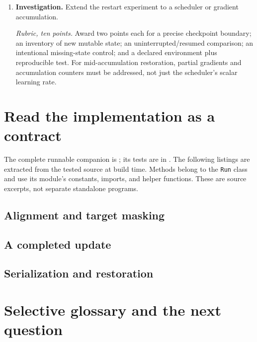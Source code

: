 \begin{enumerate}
\item \textbf{Investigation.} Extend the restart experiment to a scheduler or gradient accumulation.\par
\textit{Rubric, ten points.} Award two points each for a precise checkpoint boundary; an inventory of new mutable state; an uninterrupted/resumed comparison; an intentional missing-state control; and a declared environment plus reproducible test. For mid-accumulation restoration, partial gradients and accumulation counters must be addressed, not just the scheduler's scalar learning rate.
\end{enumerate}

\section{Read the implementation as a contract}

The complete runnable companion is ; its tests are in . The following listings are extracted from the tested source at build time. Methods belong to the \texttt{Run} class and use its module's constants, imports, and helper functions. These are source excerpts, not separate standalone programs.

\subsection{Alignment and target masking}
\subsection{A completed update}
\subsection{Serialization and restoration}

\section{Selective glossary and the next question}

